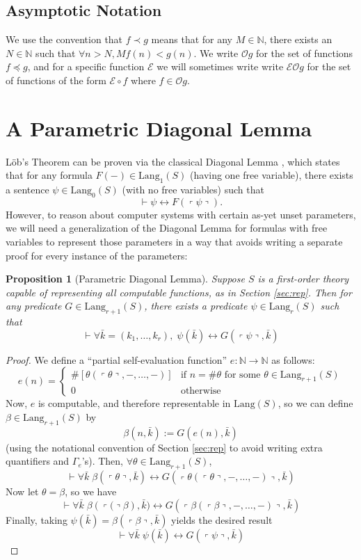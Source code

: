 \documentclass[onecolumn,authordate]{miri-tech-article}
\newtheorem{proposition}[theorem]{Proposition}
\numberwithin{equation}{section}
\theoremstyle{definition}
\newcommand{\NN}{\mathbb{N}}
\newcommand{\Ee}{\mathcal{E}}
\newcommand{\Oo}{\mathcal{O}}
\newcommand{\proves}[1]{\underset{#1}{\vdash}}
\newcommand{\Lang}{\mathrm{Lang}}
\renewcommand{\to}{\rightarrow}
\renewcommand{\iff}{\leftrightarrow}
\newcommand{\qquote}[1]{\left\ulcorner #1 \right\urcorner}
\renewcommand{\-}{^{-1}}
\begin{document}
\subsection{Asymptotic Notation}
We use the convention that $f \prec g$ means that for any $M\in \NN$, there exists an $N\in\NN$ such that $\forall n>N, Mf(n) < g(n)$.  We write $\Oo g$ for the set of functions $f\preceq g$, and for a specific function $\Ee$ we will sometimes write write $\Ee \Oo g$ for the set of functions of the form $\Ee \circ f$ where $f\in \Oo g$.

\section{A Parametric Diagonal Lemma}
L\"{o}b's Theorem can be proven via the classical Diagonal Lemma \citep{Carnap:1934}, which states that for any formula $F(-)\in\Lang_1(S)$ (having one free variable), there exists a sentence $\psi\in\Lang_0(S)$ (with no free variables) such that 
$$\proves{} \psi \iff F(\qquote\psi).$$
However, to reason about computer systems with certain as-yet unset parameters, we will need a generalization of the Diagonal Lemma for formulas with free variables to represent those parameters in a way that avoids writing a separate proof for every instance of the parameters:

\begin{proposition}[Parametric Diagonal Lemma]Suppose $S$ is a first-order theory capable of representing all computable functions, as in Section \ref{sec:rep}.  Then for any predicate $G\in\Lang_{r+1}(S)$, there exists a predicate $\psi\in\Lang_r(S)$ such that
$$\proves{} \forall \bar k = (k_1,\ldots,k_r), \; \psi(\bar k) \iff G(\qquote\psi,\bar k)$$
\end{proposition}
\begin{proof}
We define a ``partial self-evaluation function'' $e:\NN\to\NN$ as follows: 
$$e(n) = \begin{cases} 
\#\left[\theta(\qquote\theta,-,\ldots,-)\right] &\mbox{if } n = \#\theta \text{ for some }\theta\in\Lang_{r+1}(S) \\ 
0 & \mbox{otherwise }
\end{cases}
$$
Now, $e$ is computable, and therefore representable in $\Lang(S)$, so we can define $\beta\in\Lang_{r+1}(S)$ by 
$$\beta(n,\bar k) := G(e(n),\bar k)$$ 
(using the notational convention of Section \ref{sec:rep} to avoid writing extra quantifiers and $\Gamma_e$'s).  Then, $\forall \theta\in\Lang_{r+1}(S)$,
$$\proves{} \forall \bar k\; \beta(\qquote{\theta},\bar k) \iff G(\qquote{\theta(\qquote{\theta},-,\ldots,-)},\bar k)$$
Now let $\theta = \beta$, so we have
$$\proves{} \forall \bar k\; \beta(\qquote(\beta),\bar k) \iff G(\qquote{\beta(\qquote{\beta},-,\ldots,-)},\bar k)$$
%
Finally, taking $\psi(\bar k) = \beta(\qquote{\beta},\bar k)$ yields the desired result
$$\proves{} \forall \bar k\; \psi(\bar k) \iff G(\qquote{\psi},\bar k)$$


\end{proof}
\end{document}
